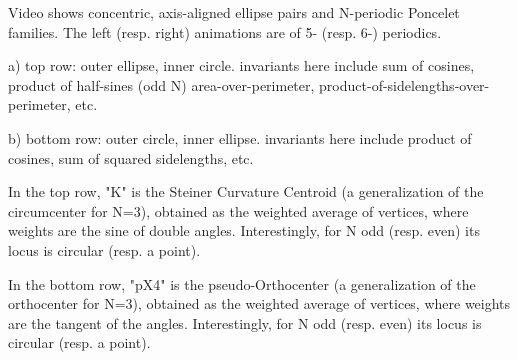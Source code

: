 Video shows concentric, axis-aligned ellipse pairs and N-periodic Poncelet families.  The left (resp. right) animations are of 5- (resp. 6-) periodics.

a) top row: outer ellipse, inner circle. invariants here include sum of cosines, product of half-sines (odd N) area-over-perimeter, product-of-sidelengths-over-perimeter, etc.

b) bottom row: outer circle, inner ellipse. invariants here include product of cosines, sum of squared sidelengths, etc.

In the top row, "K" is the Steiner Curvature Centroid (a generalization of the circumcenter for N=3), obtained as the weighted average of vertices, where weights are the sine of double angles. Interestingly, for N odd (resp. even) its locus is circular (resp. a point).

In the bottom row, "pX4" is the pseudo-Orthocenter (a generalization of the orthocenter for N=3), obtained as the weighted average of vertices, where weights are the tangent of the angles. Interestingly, for N odd (resp. even) its locus is circular (resp. a point).